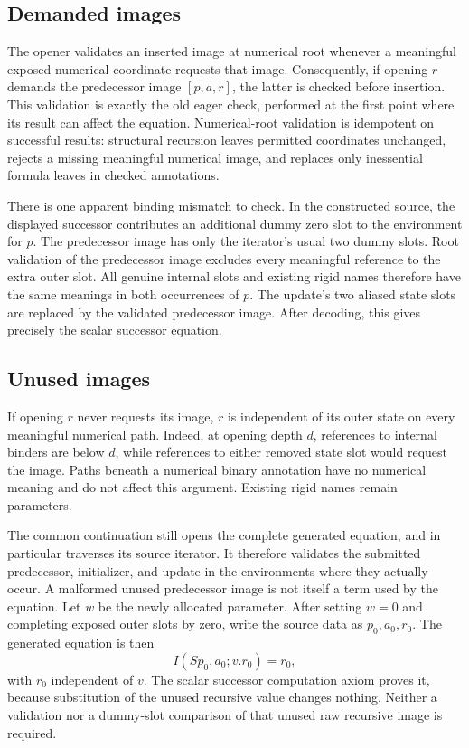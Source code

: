 \documentclass[11pt,letterpaper]{article}
\theoremstyle{definition}\newtheorem{definition}[theorem]{Definition}
\theoremstyle{remark}\newtheorem{remark}[theorem]{Remark}
\begin{document}
\subsection{Demanded images}

The opener validates an inserted image at numerical root whenever a
meaningful exposed numerical coordinate requests that image.  Consequently,
if opening $r$ demands the predecessor image $[p,a,r]$, the latter is
checked before insertion.  This validation is exactly the old eager
check, performed at the first point where its result can affect the
equation.  Numerical-root validation is idempotent on successful results:
structural recursion leaves permitted coordinates unchanged, rejects a
missing meaningful numerical image, and replaces only inessential
formula leaves in checked annotations.

There is one apparent binding mismatch to check.  In the constructed
source, the displayed successor contributes an additional dummy zero
slot to the environment for $p$.  The predecessor image has only the
iterator's usual two dummy slots.  Root validation of the predecessor
image excludes every meaningful reference to the extra outer slot.
All genuine internal slots and existing rigid names therefore have the
same meanings in both occurrences of $p$.  The update's two aliased
state slots are replaced by the validated predecessor image.  After
decoding, this gives precisely the scalar successor equation.

\subsection{Unused images}

If opening $r$ never requests its image, $r$ is independent of its outer
state on every meaningful numerical path.  Indeed, at opening depth
$d$, references to internal binders are below $d$, while references to
either removed state slot would request the image.  Paths beneath a
numerical binary annotation have no numerical meaning and do not affect
this argument.  Existing rigid names remain parameters.

The common continuation still opens the complete generated equation,
and in particular traverses its source iterator.  It therefore validates
the submitted predecessor, initializer, and update in the environments
where they actually occur.  A malformed unused predecessor image is
not itself a term used by the equation.  Let $w$ be the newly allocated
parameter.  After setting $w=0$ and completing exposed outer slots by
zero, write the source data as $p_0,a_0,r_0$.  The generated equation is
then
\[
 I(Sp_0,a_0;v.r_0)=r_0,
\]
with $r_0$ independent of $v$.  The scalar successor computation axiom
proves it, because substitution of the unused recursive value changes
nothing.  Neither a validation nor a dummy-slot comparison of that
unused raw recursive image is required.
\end{document}

